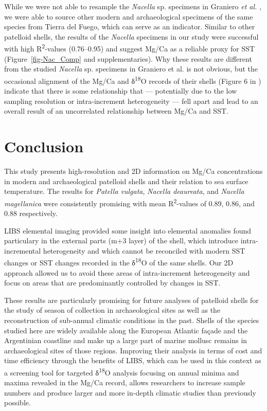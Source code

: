 \documentclass[
  authoryear,
  preprint,
  3p]{elsarticle}
\begin{document}
While we were not able to resample the \emph{Nacella} sp. specimens in
Graniero \emph{et al.} \citeyearpar{Graniero2017-io}, we were able to
source other modern and archaeological specimens of the same species
from Tierra del Fuego, which can serve as an indicator. Similar to other
patelloid shells, the results of the \emph{Nacella} specimens in our
study were successful with high R\textsuperscript{2}-values (0.76--0.95)
and suggest Mg/Ca as a reliable proxy for SST (Figure~\ref{fig-Nac_Comp}
and supplementaries). Why these results are different from the studied
\emph{Nacella} sp. specimens in Graniero et al.
\citeyearpar{Graniero2017-io} is not obvious, but the occasional
alignment of the Mg/Ca and δ\textsuperscript{18}O records of their
shells (Figure 6 in \citep{Graniero2017-io} ) indicate that there is
some relationship that --- potentially due to the low sampling
resolution or intra-increment heterogeneity --- fell apart and lead to
an overall result of an uncorrelated relationship between Mg/Ca and SST.

\section{Conclusion}\label{conclusion}

This study presents high-resolution and 2D information on Mg/Ca
concentrations in modern and archaeological patelloid shells and their
relation to sea surface temperature. The results for \emph{Patella
vulgata}, \emph{Nacella deaureata}, and \emph{Nacella magellanica} were
consistently promising with mean R\textsuperscript{2}-values of 0.89,
0.86, and 0.88 respectively.

LIBS elemental imaging provided some insight into elemental anomalies
found particulary in the external parts (m+3 layer) of the shell, which
introduce intra-incremental heterogeneity and which cannot be reconciled
with modern SST changes or SST changes recorded in the
δ\textsuperscript{18}O of the same shells. Our 2D approach allowed us to
avoid these areas of intra-increment heterogeneity and focus on areas
that are predominantly controlled by changes in SST.

These results are particularly promising for future analyses of
patelloid shells for the study of season of collection in archaeological
sites as well as the reconstruction of sub-annual climatic conditions in
the past. Shells of the species studied here are widely available along
the European Atlantic façade and the Argentinian coastline and make up a
large part of marine mollusc remains in archaeological sites of those
regions. Improving their analysis in terms of cost and time efficiency
through the benefits of LIBS, which can be used in this context as a
screening tool for targeted δ\textsuperscript{18}O analysis focusing on
annual minima and maxima revealed in the Mg/Ca record, allows
researchers to increase sample numbers and produce larger and more
in-depth climatic studies than previously possible.


\renewcommand\refname{References}
  
\end{document}
